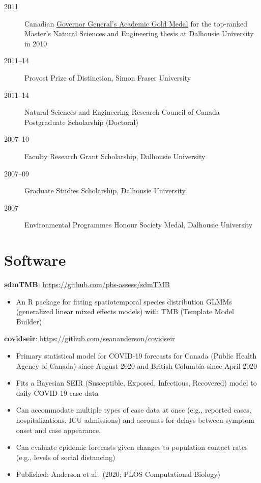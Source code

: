 \begin{description}
\item[2011]
Canadian \href{http://goo.gl/nA1zE}{Governor General's Academic Gold
Medal} for the top-ranked Master's Natural Sciences and Engineering
thesis at Dalhousie University in 2010
\item[2011--14]
Provost Prize of Distinction, Simon Fraser University
\item[2011--14]
Natural Sciences and Engineering Research Council of Canada Postgraduate
Scholarship (Doctoral)
\item[2007--10]
Faculty Research Grant Scholarship, Dalhousie University
\item[2007--09]
Graduate Studies Scholarship, Dalhousie University
\item[2007]
Environmental Programmes Honour Society Medal, Dalhousie University
\end{description}

\section{Software}\label{software}


\textbf{sdmTMB}: \url{https://github.com/pbs-assess/sdmTMB}

\begin{itemize}
\tightlist
\item
  An R package for fitting spatiotemporal species distribution GLMMs
  (generalized linear mixed effects models) with TMB (Template Model
  Builder)
\end{itemize}

\textbf{covidseir}: \url{https://github.com/seananderson/covidseir}

\begin{itemize}
\tightlist
\item
  Primary statistical model for COVID-19 forecasts for Canada (Public
  Health Agency of Canada) since August 2020 and British Columbia since
  April 2020
\item
  Fits a Bayesian SEIR (Susceptible, Exposed, Infectious, Recovered)
  model to daily COVID-19 case data
\item
  Can accommodate multiple types of case data at once (e.g., reported
  cases, hospitalizations, ICU admissions) and accounts for delays
  between symptom onset and case appearance.
\item
  Can evaluate epidemic forecasts given changes to population contact
  rates (e.g., levels of social distancing)
\item
  Published: Anderson et al.\ (2020; PLOS Computational Biology)
\end{itemize}

